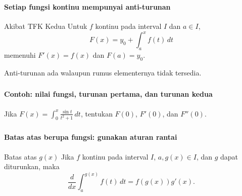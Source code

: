 \documentclass{../../kalkulus-ppt}
\begin{document}
\begin{frame}
\frametitle{\insertsection}
\framesubtitle{Setiap fungsi kontinu mempunyai anti-turunan}

\begin{block}{Akibat TFK Kedua}
Untuk $f$ kontinu pada interval $I$ dan $a\in I$,
\[F(x)=y_0+\int_a^x f(t)\,dt\]
memenuhi $F'(x)=f(x)$ dan $F(a)=y_0$.
\end{block}
Anti-turunan ada walaupun rumus elementernya tidak tersedia.
\end{frame}

\begin{frame}
\frametitle{\insertsection}
\framesubtitle{Contoh: nilai fungsi, turunan pertama, dan turunan kedua}

\begin{contoh}
Jika $\displaystyle F(x)=\int_0^x\frac{\sin t}{t^2+1}\,dt$, tentukan $F(0)$, $F'(0)$, dan $F''(0)$.
\end{contoh}
\end{frame}

\begin{frame}
\frametitle{\insertsection}
\framesubtitle{Batas atas berupa fungsi: gunakan aturan rantai}

\begin{block}{Batas atas $g(x)$}
Jika $f$ kontinu pada interval $I$, $a,g(x)\in I$, dan $g$ dapat diturunkan, maka
\[\frac{d}{dx}\int_a^{g(x)} f(t)\,dt=f(g(x))g'(x).\]
\end{block}
\end{frame}
\end{document}
